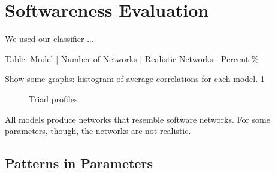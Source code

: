 

\section{Softwareness Evaluation}

We used our classifier ...

Table: Model | Number of Networks | Realistic Networks | Percent \%

Show some graphs: histogram of average correlations for each model.
\ref{fig:histograms}


\begin{figure}[!t]
\center




\caption{Triad profiles}
\label{fig:histograms}
\end{figure}

All models produce networks that resemble software networks.  For some
parameters, though, the networks are not realistic.

\subsection{Patterns in Parameters}

